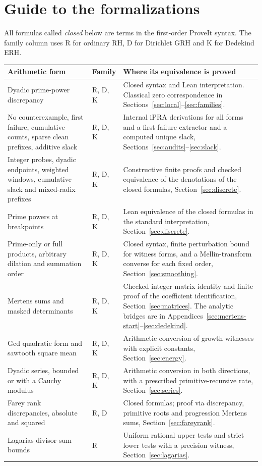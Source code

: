 \newpage
\section*{Guide to the formalizations}
All formulas called \emph{closed} below are terms in the first-order ProveIt syntax. The family column uses R for ordinary RH, D for Dirichlet GRH and K for Dedekind ERH.
\begin{center}\small
\begin{tabular}{@{}p{.32\linewidth}p{.12\linewidth}p{.48\linewidth}@{}}\toprule
Arithmetic form & Family & Where its equivalence is proved\\\midrule
Dyadic prime-power discrepancy & R, D, K & Closed syntax and Lean interpretation. Classical zero correspondence in Sections~\ref{sec:local}--\ref{sec:families}.\\[3pt]
No counterexample, first failure, cumulative counts, sparse clean prefixes, additive slack & R, D, K & Internal iPRA derivations for all forms and a first-failure extractor and a computed unique slack, Sections~\ref{sec:audits}--\ref{sec:slack}.\\[3pt]
Integer probes, dyadic endpoints, weighted windows, cumulative slack and mixed-radix prefixes & R, D, K & Constructive finite proofs and checked equivalence of the denotations of the closed formulas, Section~\ref{sec:discrete}.\\[3pt]
Prime powers at breakpoints & R, D, K & Lean equivalence of the closed formulas in the standard interpretation, Section~\ref{sec:discrete}.\\[3pt]
Prime-only or full products, arbitrary dilation and summation order & R, D, K & Closed syntax, finite perturbation bound for witness forms, and a Mellin-transform converse for each fixed order, Section~\ref{sec:smoothing}.\\[3pt]
Mertens sums and masked determinants & R, D, K & Checked integer matrix identity and finite proof of the coefficient identification, Section~\ref{sec:matrices}. The analytic bridges are in Appendices~\ref{sec:mertens-start}--\ref{sec:dedekind}.\\[3pt]
Gcd quadratic form and sawtooth square mean & R, D, K & Arithmetic conversion of growth witnesses with explicit constants, Section~\ref{sec:energy}.\\[3pt]
Dyadic series, bounded or with a Cauchy modulus & R, D, K & Arithmetic conversion in both directions, with a prescribed primitive-recursive rate, Section~\ref{sec:series}.\\[3pt]
Farey rank discrepancies, absolute and squared & R, D & Closed formulas; proof via discrepancy, primitive roots and progression Mertens sums, Section~\ref{sec:fareyrank}.\\[3pt]
Lagarias divisor-sum bounds & R & Uniform rational upper tests and strict lower tests with a precision witness, Section~\ref{sec:lagarias}.\\\bottomrule
\end{tabular}
\end{center}

